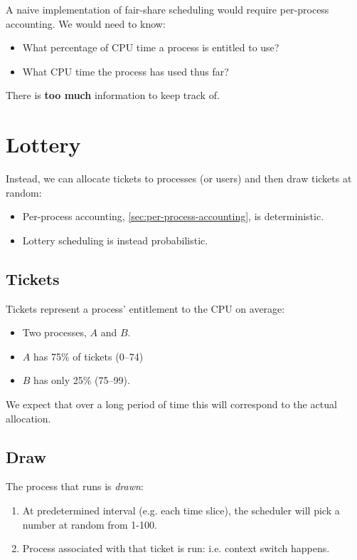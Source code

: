A naive implementation of fair-share scheduling would require per-process accounting.
We would need to know:
\begin{itemize}
\item What percentage of CPU time a process is entitled to use?
\item What CPU time the process has used thus far?
\end{itemize}
There is \textbf{too much} information to keep track of.


\section{Lottery}

Instead, we can allocate tickets to processes (or users) and then draw tickets at random:
\begin{itemize}
\item Per-process accounting, \autoref{sec:per-process-accounting}, is deterministic.
\item Lottery scheduling is instead probabilistic. 
\end{itemize}

\subsection{Tickets}

Tickets represent a process' entitlement to the CPU on average:
\begin{itemize}
\item Two processes, $A$ and $B$.
\item $A$ has 75\% of tickets (0--74)
\item $B$ has only 25\% (75--99).
\end{itemize}
We expect that over a long period of time this will correspond to the actual allocation.

\subsection{Draw}

The process that runs is \textit{drawn}:

\begin{enumerate}
\item At predetermined interval (e.g. each time slice), the scheduler will pick a number at random from 1-100.
\item Process associated with that ticket is run: i.e. context switch happens.
\end{enumerate}


